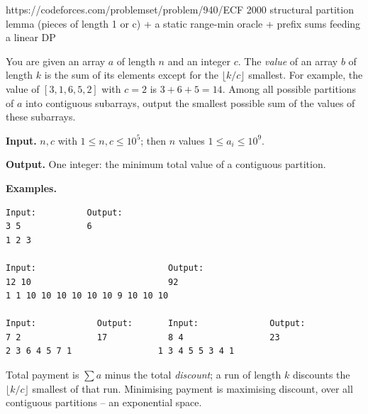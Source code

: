   {https://codeforces.com/problemset/problem/940/E}{CF 2000}
  {structural partition lemma (pieces of length 1 or c) + a static range-min oracle + prefix sums feeding a linear DP}

\begin{problemstatement}[CF 940E Cashback]
You are given an array \(a\) of length \(n\) and an integer \(c\).  The
\emph{value} of an array \(b\) of length \(k\) is the sum of its elements except
for the \(\lfloor k/c\rfloor\) smallest.  For example, the value of
\([3,1,6,5,2]\) with \(c=2\) is \(3+6+5=14\).  Among all possible partitions of
\(a\) into contiguous subarrays, output the smallest possible sum of the values
of these subarrays.

\textbf{Input.} \(n,c\) with \(1\le n,c\le 10^5\); then \(n\) values
\(1\le a_i\le 10^9\).

\textbf{Output.} One integer: the minimum total value of a contiguous partition.

\textbf{Examples.}
\begin{verbatim}
Input:          Output:
3 5             6
1 2 3

Input:                          Output:
12 10                           92
1 1 10 10 10 10 10 10 9 10 10 10

Input:            Output:       Input:              Output:
7 2               17            8 4                 23
2 3 6 4 5 7 1                 1 3 4 5 5 3 4 1
\end{verbatim}
\end{problemstatement}

\begin{attemptgate}
Total payment is \(\sum a\) minus the total \emph{discount}; a run of length \(k\)
discounts the \(\lfloor k/c\rfloor\) smallest of that run.  Minimising payment is
maximising discount, over all contiguous partitions -- an exponential space.
\end{attemptgate}

